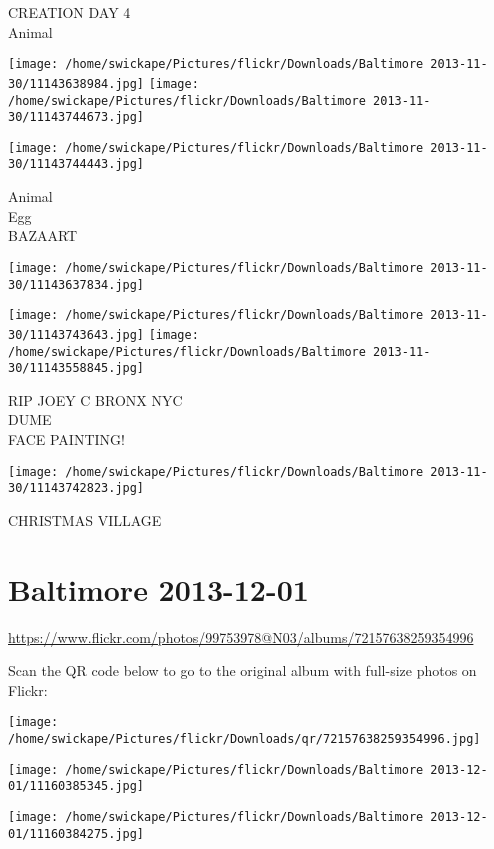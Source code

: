 \documentclass[10pt,letterpaper]{article}
\begin{document}
CREATION DAY 4\\
Animal
\pagebreak

\texttt{[image: /home/swickape/Pictures/flickr/Downloads/Baltimore 2013-11-30/11143638984.jpg]}
\texttt{[image: /home/swickape/Pictures/flickr/Downloads/Baltimore 2013-11-30/11143744673.jpg]}

\vspace{0.25in}
\texttt{[image: /home/swickape/Pictures/flickr/Downloads/Baltimore 2013-11-30/11143744443.jpg]}

Animal\\
Egg\\
BAZAART
\pagebreak

\texttt{[image: /home/swickape/Pictures/flickr/Downloads/Baltimore 2013-11-30/11143637834.jpg]}

\vspace{0.25in}
\texttt{[image: /home/swickape/Pictures/flickr/Downloads/Baltimore 2013-11-30/11143743643.jpg]}
\texttt{[image: /home/swickape/Pictures/flickr/Downloads/Baltimore 2013-11-30/11143558845.jpg]}

RIP JOEY C BRONX NYC\\
DUME\\
FACE PAINTING!
\pagebreak

\texttt{[image: /home/swickape/Pictures/flickr/Downloads/Baltimore 2013-11-30/11143742823.jpg]}

CHRISTMAS VILLAGE
\pagebreak

\section*{Baltimore 2013-12-01}

\url{https://www.flickr.com/photos/99753978@N03/albums/72157638259354996}

Scan the QR code below to go to the original album with full-size photos on Flickr:

\texttt{[image: /home/swickape/Pictures/flickr/Downloads/qr/72157638259354996.jpg]}
\pagebreak

\texttt{[image: /home/swickape/Pictures/flickr/Downloads/Baltimore 2013-12-01/11160385345.jpg]}

\vspace{0.25in}
\texttt{[image: /home/swickape/Pictures/flickr/Downloads/Baltimore 2013-12-01/11160384275.jpg]}
\end{document}

